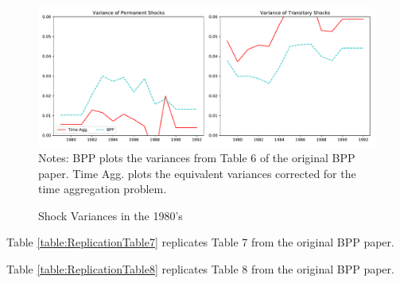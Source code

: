 \documentclass[titlepage]{\econtex}\newcommand{\texname}{BPP_PSID_TimeAgg}
\begin{document}
\begin{figure}
	\caption{Shock Variances in the 1980's}
	\label{shockVariance}
	\includegraphics[width=1\textwidth]{../../Code/Figures/ShockVariances1980s.pdf}
	\footnotesize Notes: BPP plots the variances from Table 6 of the original BPP paper. Time Agg. plots the equivalent variances corrected for the time aggregation problem.
\end{figure}

Table \ref{table:ReplicationTable7} replicates Table 7 from the original BPP paper.



Table \ref{table:ReplicationTable8} replicates Table 8 from the original BPP paper.



\processdelayedfloats


%

\pagebreak\appendix


\end{document}
